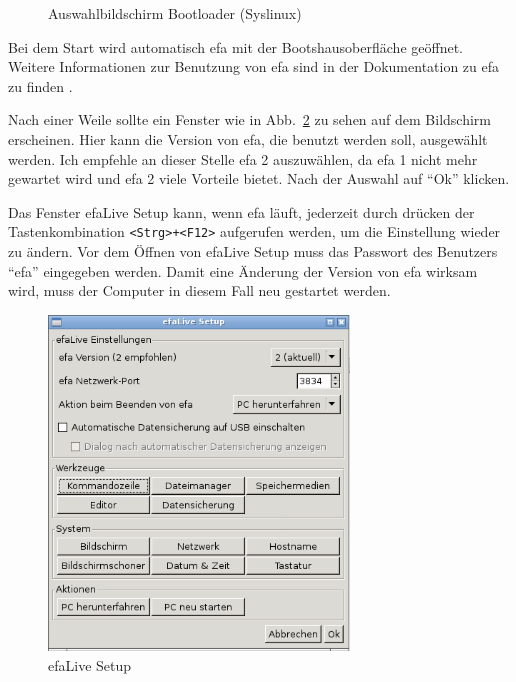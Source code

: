 \documentclass[a4paper,12pt,twoside]{article}
\begin{document}
\begin{figure}
    \centering
    \caption{Auswahlbildschirm Bootloader (Syslinux)}
    \label{fig:syslinux}
\end{figure}

Bei dem Start wird automatisch efa mit der Bootshausoberfläche geöffnet.
Weitere Informationen zur Benutzung von efa sind in der Dokumentation
zu efa zu finden \cite{EFA2}.

Nach einer Weile sollte ein Fenster wie in Abb.~\ref{fig:efalivesetup_live} zu
sehen auf dem Bildschirm erscheinen. Hier kann die Version von efa, die
benutzt werden soll, ausgewählt werden. Ich empfehle an dieser Stelle
efa 2 auszuwählen, da efa 1 nicht mehr gewartet wird und efa 2 viele
Vorteile bietet. Nach der Auswahl auf "`Ok"' klicken.

Das Fenster efaLive Setup kann, wenn efa läuft, jederzeit durch drücken
der Tastenkombination \texttt{{\textless}Strg{\textgreater}+{\textless}F12{\textgreater}} 
aufgerufen
werden, um die Einstellung wieder zu ändern. Vor dem Öffnen von efaLive
Setup muss das Passwort des Benutzers "`efa"'
eingegeben werden. Damit eine Änderung der Version von efa wirksam
wird, muss der Computer in diesem Fall neu gestartet werden.

\begin{figure}
    \centering
    \includegraphics[width=8cm]{efaLivede-img/efaLivede-img3.png}
    \caption{efaLive Setup}
    \label{fig:efalivesetup_live}
\end{figure}
\end{document}
